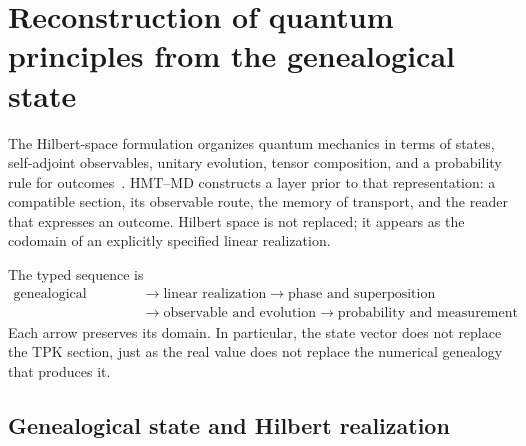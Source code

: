 \section{Reconstruction of quantum principles from the genealogical state}
\label{v:rec:sec:postulados-cuanticos-genealogicos-rev2}

The Hilbert-space formulation organizes quantum mechanics in terms of states,
self-adjoint observables, unitary evolution, tensor composition, and a
probability rule for outcomes~\cite{vonNeumann1932}. HMT--MD
constructs a layer prior to that representation: a compatible section,
its observable route, the memory of transport, and the reader that expresses an
outcome. Hilbert space is not replaced; it appears as the codomain of
an explicitly specified linear realization.

The typed sequence is
\[
 \boxed{\begin{aligned}
 \text{genealogical section}
 &\longrightarrow \text{linear realization}
 \longrightarrow \text{phase and superposition}\\
 &\longrightarrow \text{observable and evolution}
 \longrightarrow \text{probability and measurement}
 \end{aligned}}
\]
Each arrow preserves its domain. In particular, the state vector does not
replace the TPK section, just as the real value does not replace
the numerical genealogy that produces it.

\subsection{Genealogical state and Hilbert realization}
\label{v:rec:realizacion_evolucion:section:02}

